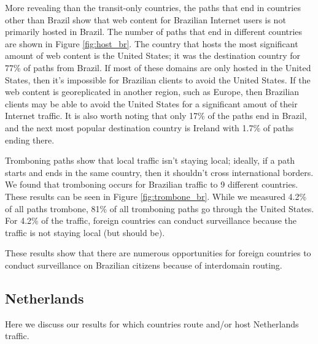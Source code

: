 More revealing than the transit-only countries, the paths that end in countries other than Brazil show that web content for Brazilian Internet users is not primarily hosted in Brazil.  The number of paths that end in different countries are shown in Figure \ref{fig:host_br}.  The country that hosts the most significant amount of web content is the United States; it was the destination country for 77\% of paths from Brazil.  If most of these domains are only hosted in the United States, then it's impossible for Brazilian clients to avoid the United States.  If the web content is georeplicated in another region, such as Europe, then Brazilian clients may be able to avoid the United States for a significant amout of their Internet traffic.  It is also worth noting that only 17\% of the paths end in Brazil, and the next most popular destination country is Ireland with 1.7\% of paths ending there.  

Tromboning paths show that local traffic isn't staying local; ideally, if a path starts and ends in the same country, then it shouldn't cross international borders.  We found that tromboning occurs for Brazilian traffic to 9 different countries.  These results can be seen in Figure \ref{fig:trombone_br}.  While we measured 4.2\% of all paths trombone, 81\% of all tromboning paths go through the United States.  For 4.2\% of the traffic, foreign countries can conduct surveillance because the traffic is not staying local (but should be). 



These results show that there are numerous opportunities for foreign countries to conduct surveillance on Brazilian citizens because of interdomain routing. 

\subsection{Netherlands}
Here we discuss our results for which countries route and/or host Netherlands traffic. 

